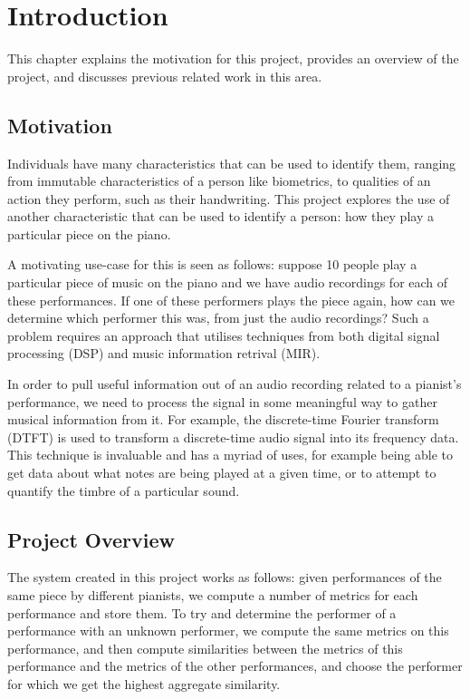 \documentclass[oneside, class=book, crop=false, 12pt]{standalone}
\begin{document}
\ifstandalone
  \setcounter{chapter}{0}
  \chapter{Introduction}
\fi
{}

This chapter explains the motivation for this project, provides an overview of the project, and discusses previous related work in this area.

\section{Motivation}

Individuals have many characteristics that can be used to identify them, ranging from immutable characteristics of a person like biometrics, to qualities of an action they perform, such as their handwriting. This project explores the use of another characteristic that can be used to identify a person: how they play a particular piece on the piano. 

A motivating use-case for this is seen as follows: suppose 10 people play a particular piece of music on the piano and we have audio recordings for each of these performances. If one of these performers plays the piece again, how can we determine which performer this was, from just the audio recordings? Such a problem requires an approach that utilises techniques from both digital signal processing (DSP) and music information retrival (MIR).

In order to pull useful information out of an audio recording related to a pianist's performance, we need to process the signal in some meaningful way to gather musical information from it. For example, the discrete-time Fourier transform (DTFT) is used to transform a discrete-time audio signal into its frequency data. This technique is invaluable and has a myriad of uses, for example being able to get data about what notes are being played at a given time, or to attempt to quantify the timbre of a particular sound.

\section{Project Overview}

The system created in this project works as follows: given performances of the same piece by different pianists, we compute a number of metrics for each performance and store them. To try and determine the performer of a performance with an unknown performer, we compute the same metrics on this performance, and then compute similarities between the metrics of this performance and the metrics of the other performances, and choose the performer for which we get the highest aggregate similarity.
\end{document}
